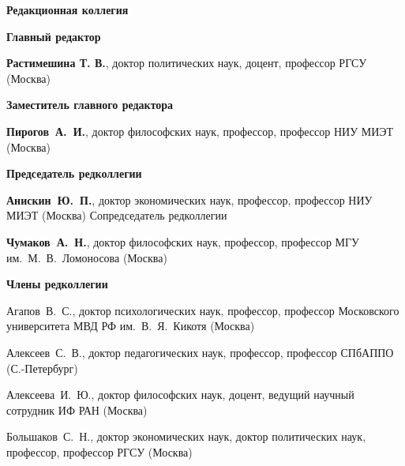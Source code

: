 


\vspace*{-4em}

\begin{center}
    \textbf{Редакционная коллегия}
\end{center}



\begin{multicols}{2}
        
    \scriptsize

    \begin{center}
    \textbf{Главный редактор}
    \end{center}

    \noindent     \textbf{Растимешина Т. В.}, доктор политических наук, доцент, профессор РГСУ (Москва)

    \begin{center}
    \textbf{Заместитель главного редактора}
    \end{center}

    \noindent     \textbf{Пирогов А. И.}, доктор философских наук, профессор, профессор НИУ МИЭТ (Москва)
    
    \begin{center}
    \textbf{Председатель редколлегии}
    \end{center}
    
    \noindent     \textbf{Анискин Ю. П.}, доктор экономических наук, профессор, профессор НИУ МИЭТ (Москва)
    Сопредседатель редколлегии
    
    \noindent     \textbf{Чумаков А. Н.}, доктор философских наук, профессор, профессор МГУ им. М. В. Ломоносова (Москва) 

    \begin{center}
        \textbf{Члены редколлегии}
    \end{center}
    
    
    \noindent     Агапов В. С., доктор психологических наук, профессор, профессор Московского университета МВД РФ им. В. Я. Кикотя (Москва)
    
    \noindent    Алексеев С. В., доктор педагогических наук, профессор, профессор СПбАППО (С.-Петербург)
    
    \noindent     Алексеева И. Ю., доктор философских наук, доцент, ведущий научный сотрудник ИФ РАН (Москва)
    
    \noindent Большаков С. Н., доктор экономических наук, доктор политических наук, профессор, профессор РГСУ (Москва)
    

\end{multicols}
